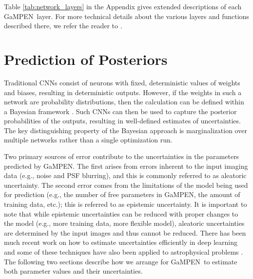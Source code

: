 \documentclass[twocolumn]{aastex63}
\newcommand\gampen{GaMPEN}
\begin{document}
\begin{CJK*}{UTF8}{gbsn}
Table \ref{tab:network_layers} in the Appendix gives extended descriptions of each \gampen\ layer. 
For more technical details about the various layers and functions described there, we refer the reader to \cite{nielsen,goodfellow_16,chollet_21}.


\section{Prediction of Posteriors} \label{sec:uncertainties}
Traditional CNNs consist of neurons with fixed, deterministic values of weights and biases, resulting in deterministic outputs. However, if the weights in such a network are probability distributions, then the calculation can be defined within a Bayesian framework \citep{denker_91}. Such CNNs can then be used to capture the posterior probabilities of the outputs, resulting in well-defined estimates of uncertainties. The key distinguishing property of the Bayesian approach is marginalization over multiple networks rather than a single optimization run. 

Two primary sources of error contribute to the uncertainties in the parameters predicted by \gampen{}. The first arises from errors inherent to the input imaging data (e.g., noise and PSF blurring), and this is commonly referred to as aleatoric uncertainty. The second error comes from the limitations of the model being used for prediction (e.g., the number of free parameters in \gampen{}, the amount of training data, etc.); this is referred to as epistemic uncertainty. It is important to note that while epistemic uncertainties can be reduced with proper changes to the model (e.g., more training data, more flexible model), aleatoric uncertainties are determined by the input images and thus cannot be reduced. There has been much recent work on how to estimate uncertainties efficiently in deep learning \citep[e.g.,][]{gal_2016,Kendall2017WhatVision,Pawlowski2017ImplicitNetworks,Wilson2020BayesianGeneralization} and some of these techniques have also been applied to astrophysical problems \citep[e.g.,][]{PerreaultLevasseur2017UncertaintiesLensing, Walmsley2020GalaxyLearning, Wagner-Carena2021HierarchicalLensing, Cranmer2021ASystems}. The following two sections describe how we arrange for \gampen\ to estimate both parameter values and their uncertainties.


\end{CJK*}
\end{document}
